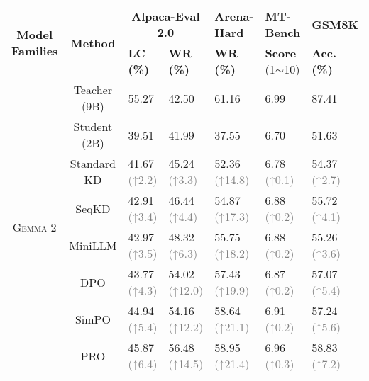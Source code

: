 
\begin{table*}[htbp]
\vspace{-2mm}

\centering
\small
\setlength{\tabcolsep}{0.95em}
\renewcommand{\arraystretch}{1.2}
\begin{tabular*}{\textwidth}{cc ll lll}
\toprule
\multirow{2}{*}{\textbf{Model Families}} & \multirow{2}{*}{\textbf{Method}} & \multicolumn{2}{c}{\textbf{Alpaca-Eval 2.0}} & \textbf{Arena-Hard} & \textbf{MT-Bench} & \textbf{GSM8K} \\ \cline{3-7} 
& & \textbf{LC (\%)} & \textbf{WR (\%)} & \textbf{WR (\%)} & \textbf{Score} (1$\sim$10) & \textbf{Acc. (\%)} \\ \hline
\multirow{12}{*}{\textsc{Gemma-2}} & Teacher (9B) & 55.27 & 42.50 & 61.16 & 6.99 & 87.41 \\
& Student (2B) & 39.51 & 41.99 & 37.55   & 6.70 & 51.63 \\\cline{2-7}
& Standard KD & 41.67 \textcolor{gray}{\scriptsize{(↑2.2})} & 45.24 \textcolor{gray}{\scriptsize{(↑3.3})} & 52.36 \textcolor{gray}{\scriptsize{(↑14.8})} & 6.78 \textcolor{gray}{\scriptsize{(↑0.1})} & 54.37 \textcolor{gray}{\scriptsize{(↑2.7})} \\
& SeqKD & 42.91 \textcolor{gray}{\scriptsize{(↑3.4})} & 46.44 \textcolor{gray}{\scriptsize{(↑4.4})} & 54.87 \textcolor{gray}{\scriptsize{(↑17.3})} & 6.88 \textcolor{gray}{\scriptsize{(↑0.2})} & 55.72 \textcolor{gray}{\scriptsize{(↑4.1})} \\
& MiniLLM & 42.97 \textcolor{gray}{\scriptsize{(↑3.5})} & 48.32 \textcolor{gray}{\scriptsize{(↑6.3})} & 55.75 \textcolor{gray}{\scriptsize{(↑18.2})} & 6.88 \textcolor{gray}{\scriptsize{(↑0.2})} & 55.26 \textcolor{gray}{\scriptsize{(↑3.6})} \\\cline{2-7}
& DPO & 43.77 \textcolor{gray}{\scriptsize{(↑4.3})} & 54.02 \textcolor{gray}{\scriptsize{(↑12.0})} & 57.43 \textcolor{gray}{\scriptsize{(↑19.9})} & 6.87 \textcolor{gray}{\scriptsize{(↑0.2})} & 57.07 \textcolor{gray}{\scriptsize{(↑5.4})} \\
& SimPO & 44.94 \textcolor{gray}{\scriptsize{(↑5.4})} & 54.16 \textcolor{gray}{\scriptsize{(↑12.2})} & 58.64 \textcolor{gray}{\scriptsize{(↑21.1})} & 6.91 \textcolor{gray}{\scriptsize{(↑0.2})} & 57.24 \textcolor{gray}{\scriptsize{(↑5.6})} \\
& PRO & 45.87 \textcolor{gray}{\scriptsize{(↑6.4})} & 56.48 \textcolor{gray}{\scriptsize{(↑14.5})} & 58.95 \textcolor{gray}{\scriptsize{(↑21.4})} & \underline{6.96} \textcolor{gray}{\scriptsize{(↑0.3})} & 58.83 \textcolor{gray}{\scriptsize{(↑7.2})} \\\cline{2-7}

\end{tabular*}
\end{table*}

